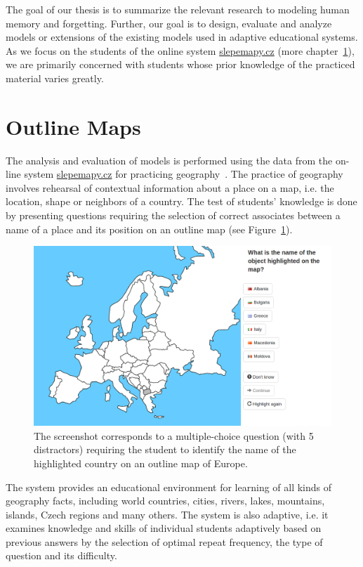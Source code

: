 The goal of our thesis is to summarize the relevant research to modeling human memory and forgetting. Further, our goal is to design, evaluate and analyze models or extensions of the existing models used in adaptive educational systems. As we focus on the students of the online system \url{slepemapy.cz} (more chapter~\ref{outline-maps}), we are primarily concerned with students whose prior knowledge of the practiced material varies greatly.

\section{Outline Maps}
\label{outline-maps}

The analysis and evaluation of models is performed using the data from the on-line system \url{slepemapy.cz} for practicing geography~\cite{Papousek2014}. The practice of geography involves rehearsal of contextual information about a place on a map, i.e. the location, shape or neighbors of a country. The test of students' knowledge is done by presenting questions requiring the selection of correct associates between a name of a place and its position on an outline map (see Figure~\ref{fig:slepemapy}).

\begin{figure}[htbp]
  \centering
  \includegraphics[width=\textwidth]{img/slepemapy}
  \caption{The screenshot corresponds to a multiple-choice question (with 5 distractors) requiring the student to identify the name of the highlighted country on an outline map of Europe.}
  \label{fig:slepemapy}
\end{figure}

The system provides an educational environment for learning of all kinds of geography facts, including world countries, cities, rivers, lakes, mountains, islands, Czech regions and many others. The system is also adaptive, i.e. it examines knowledge and skills of individual students adaptively based on previous answers by the selection of optimal repeat frequency, the type of question and its difficulty.

